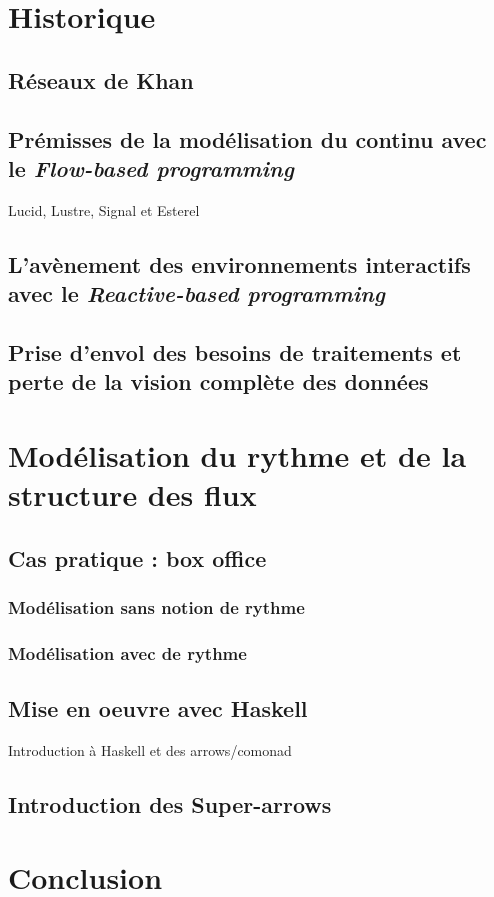 \documentclass{llncs}
\begin{document}
\section{Historique}
\subsection{Réseaux de Khan}
\subsection{Prémisses de la modélisation du continu avec le \emph{Flow-based programming}}
Lucid, Lustre, Signal et Esterel
\subsection{L'avènement des environnements interactifs avec le \emph{Reactive-based programming}}
\subsection{Prise d'envol des besoins de traitements et perte de la vision complète des données}

\section{Modélisation du rythme et de la structure des flux}
\subsection{Cas pratique : box office}
\subsubsection{Modélisation sans notion de rythme}
\subsubsection{Modélisation avec de rythme}
\subsection{Mise en oeuvre avec Haskell}
Introduction à Haskell et des arrows/comonad
\subsection{Introduction des Super-arrows}

\section{Conclusion}
\end{document}
